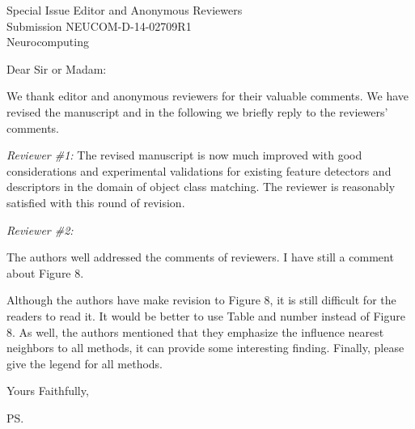 \documentclass{letter}
\begin{document}
\begin{letter}{Special Issue Editor and Anonymous Reviewers\\
Submission NEUCOM-D-14-02709R1\\
Neurocomputing}

\opening{Dear Sir or Madam:}

We thank editor and anonymous reviewers for their valuable comments.
We have revised the manuscript and in
the following we briefly reply to the reviewers' comments.

{\em Reviewer \#1:}
The revised manuscript is now much improved with good considerations and experimental validations for existing feature detectors and descriptors in the domain of object class matching. The reviewer is reasonably satisfied with this round of revision.


{\em Reviewer \#2:}

The authors well addressed the comments of reviewers. I have still a comment about Figure 8.

Although the authors have make revision to Figure 8, it is still difficult for the readers to read it. It would be better to use Table and number instead of Figure 8. As well, the authors mentioned that they emphasize the influence nearest neighbors to all methods, it can provide some interesting finding. Finally, please give the legend for all methods.


\closing{Yours Faithfully,}

\ps



\end{letter}
\end{document}
